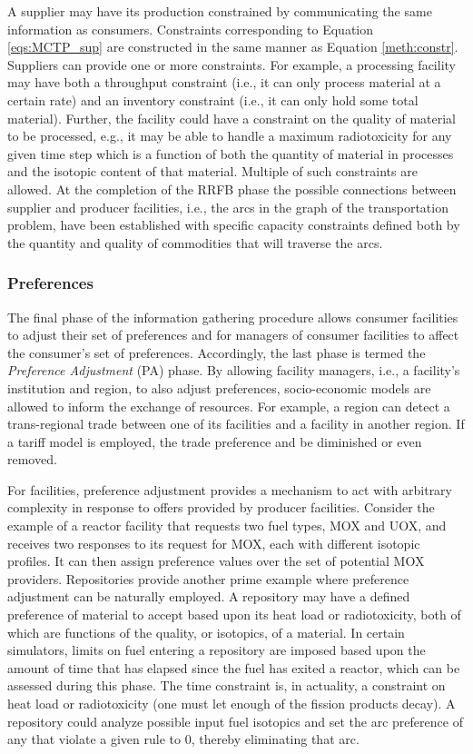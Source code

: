 A supplier may have its production constrained by communicating the same
information as consumers. Constraints corresponding to Equation
\ref{eqs:MCTP_sup} are constructed in the same manner as Equation
\ref{meth:constr}. Suppliers can provide one or more constraints. For example, a
processing facility may have both a throughput constraint (i.e., it can only
process material at a certain rate) and an inventory constraint (i.e., it can
only hold some total material). Further, the facility could have a constraint on
the quality of material to be processed, e.g., it may be able to handle a
maximum radiotoxicity for any given time step which is a function of both the
quantity of material in processes and the isotopic content of that
material. Multiple of such constraints are allowed. At the completion of the
RRFB phase the possible connections between supplier and producer facilities,
i.e., the arcs in the graph of the transportation problem, have been established
with specific capacity constraints defined both by the quantity and quality of
commodities that will traverse the arcs.

\subsubsection{Preferences}

The final phase of the information gathering procedure allows consumer
facilities to adjust their set of preferences and for managers of consumer
facilities to affect the consumer's set of preferences. Accordingly, the last
phase is termed the \textit{Preference Adjustment} (PA) phase. By allowing
facility managers, i.e., a facility's institution and region, to also adjust
preferences, socio-economic models are allowed to inform the exchange of
resources. For example, a region can detect a trans-regional trade between one of
its facilities and a facility in another region. If a tariff model is employed,
the trade preference and be diminished or even removed.

For facilities, preference adjustment provides a mechanism to act with arbitrary
complexity in response to offers provided by producer facilities. Consider the
example of a reactor facility that requests two fuel types, MOX and UOX, and
receives two responses to its request for MOX, each with different isotopic
profiles. It can then assign preference values over the set of potential MOX
providers. Repositories provide another prime example where preference
adjustment can be naturally employed. A repository may have a defined preference
of material to accept based upon its heat load or radiotoxicity, both of which
are functions of the quality, or isotopics, of a material. In certain
simulators, limits on fuel entering a repository are imposed based upon the
amount of time that has elapsed since the fuel has exited a reactor, which can
be assessed during this phase. The time constraint is, in actuality, a
constraint on heat load or radiotoxicity (one must let enough of the fission
products decay). A repository could analyze possible input fuel isotopics and
set the arc preference of any that violate a given rule to 0, thereby
eliminating that arc.

